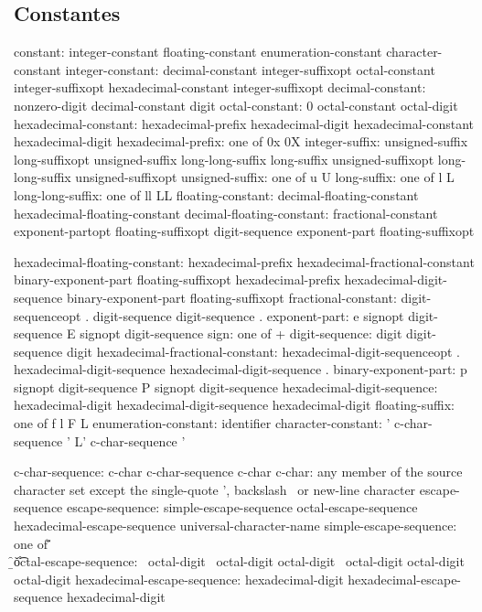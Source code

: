\subsection{Constantes}
\begin{code_files}
constant:
	integer-constant
	floating-constant
	enumeration-constant
	character-constant
integer-constant:
	decimal-constant integer-suffixopt
	octal-constant integer-suffixopt
	hexadecimal-constant integer-suffixopt
decimal-constant:
	nonzero-digit
		decimal-constant digit
octal-constant:
	0
	octal-constant octal-digit
hexadecimal-constant:
	hexadecimal-prefix hexadecimal-digit
	hexadecimal-constant hexadecimal-digit
hexadecimal-prefix: one of
	0x 0X
integer-suffix:
	unsigned-suffix long-suffixopt
	unsigned-suffix long-long-suffix
	long-suffix unsigned-suffixopt
	long-long-suffix unsigned-suffixopt
unsigned-suffix: one of
	u U
long-suffix: one of
	l L
long-long-suffix: one of
	ll LL
floating-constant:
	decimal-floating-constant
	hexadecimal-floating-constant
decimal-floating-constant:
	fractional-constant exponent-partopt floating-suffixopt
	digit-sequence exponent-part floating-suffixopt

hexadecimal-floating-constant:
	hexadecimal-prefix hexadecimal-fractional-constant
	binary-exponent-part floating-suffixopt
	hexadecimal-prefix hexadecimal-digit-sequence
	binary-exponent-part floating-suffixopt
fractional-constant:
	digit-sequenceopt . digit-sequence
	digit-sequence .
exponent-part:
	e signopt digit-sequence
	E signopt digit-sequence
sign: one of
	+
digit-sequence:
	digit
	digit-sequence digit
hexadecimal-fractional-constant:
	hexadecimal-digit-sequenceopt .
	hexadecimal-digit-sequence
	hexadecimal-digit-sequence .
binary-exponent-part:
	p signopt digit-sequence
	P signopt digit-sequence
hexadecimal-digit-sequence:
	hexadecimal-digit
	hexadecimal-digit-sequence hexadecimal-digit
floating-suffix: one of
	f l F L
enumeration-constant:
	identifier
character-constant:
	' c-char-sequence '
	L' c-char-sequence '

c-char-sequence:
	c-char
	c-char-sequence c-char
c-char:
	any member of the source character set except
	the single-quote ', backslash \, or new-line character
	escape-sequence
escape-sequence:
	simple-escape-sequence
	octal-escape-sequence
	hexadecimal-escape-sequence
	universal-character-name
simple-escape-sequence: one of
	\' \" \? \\
	\a \b \f \n \r \t
	\v
octal-escape-sequence:
	\ octal-digit
	\ octal-digit octal-digit
	\ octal-digit octal-digit octal-digit
hexadecimal-escape-sequence:
	\x hexadecimal-digit
	hexadecimal-escape-sequence hexadecimal-digit
\end{code_files}

